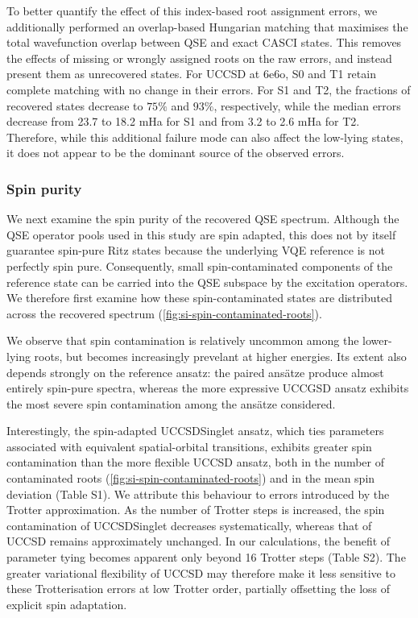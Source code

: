 To better quantify the effect of this index-based root assignment errors, we additionally performed an overlap-based Hungarian matching that maximises the total wavefunction overlap between QSE and exact CASCI states. This removes the effects of missing or wrongly assigned roots on the raw errors, and instead present them as unrecovered states.
For UCCSD at 6e6o, S0 and T1 retain complete matching with no change in their errors. For S1 and T2, the fractions of recovered states decrease to $75\%$ and $93\%$, respectively, while the median errors decrease from 23.7 to 18.2 mHa for S1 and from 3.2 to 2.6 mHa for T2.
Therefore, while this additional failure mode can also affect the low-lying states, it does not appear to be the dominant source of the observed errors.

\subsubsection{Spin purity}
We next examine the spin purity of the recovered QSE spectrum. Although the QSE operator pools used in this study are spin adapted, this does not by itself guarantee spin-pure Ritz states because the underlying VQE reference is not perfectly spin pure. 
Consequently, small spin-contaminated components of the reference state can be carried into the QSE subspace by the excitation operators.
We therefore first examine how these spin-contaminated states are distributed across the recovered spectrum (\cref{fig:si-spin-contaminated-roots}).

We observe that spin contamination is relatively uncommon among the lower-lying roots, but becomes increasingly prevelant at higher energies. 
Its extent also depends strongly on the reference ansatz: the paired ansätze produce almost entirely spin-pure spectra, whereas the more expressive UCCGSD ansatz exhibits the most severe spin contamination among the ansätze considered.

Interestingly, the spin-adapted UCCSDSinglet ansatz, which ties parameters associated with equivalent spatial-orbital transitions, exhibits greater spin contamination than the more flexible UCCSD ansatz, both in the number of contaminated roots (\cref{fig:si-spin-contaminated-roots}) and in the mean spin deviation (Table S1). 
We attribute this behaviour to errors introduced by the Trotter approximation. As the number of Trotter steps is increased, the spin contamination of UCCSDSinglet decreases systematically, whereas that of UCCSD remains approximately unchanged. In our calculations, the benefit of parameter tying becomes apparent only beyond 16 Trotter steps (Table S2). 
The greater variational flexibility of UCCSD may therefore make it less sensitive to these Trotterisation errors at low Trotter order, partially offsetting the loss of explicit spin adaptation.

